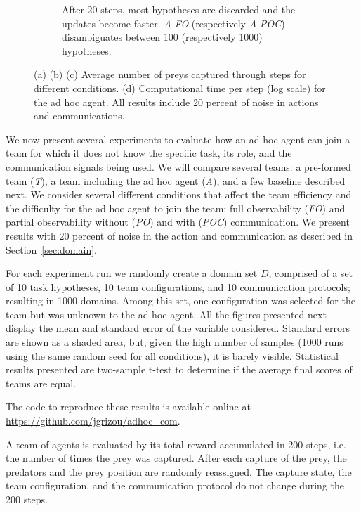 \begin{figure}[t]
\begin{subfigure}[t]{0.245\textwidth}
    \caption{After 20 steps, most hypotheses are discarded and the updates become faster. \emph{A-FO} (respectively \emph{A-POC}) disambiguates between 100 (respectively 1000) hypotheses.}
    \label{fig:comptime}
  \end{subfigure}
  \caption{(a) (b) (c) Average number of preys captured through steps for different conditions. (d) Computational time per step (log scale) for the ad hoc agent. All results include 20 percent of noise in actions and communications.\vspace{-0.3cm}}
  \label{fig:results}
\end{figure}

We now present several experiments to evaluate how an ad hoc agent can join a team for which it does not know the specific task, its role, and the communication signals being used. We will compare several teams: a pre-formed team (\emph{T}), a team including the ad hoc agent (\emph{A}), and a few baseline described next. We consider several different conditions that affect the team efficiency and the difficulty for the ad hoc agent to join the team: full observability (\emph{FO}) and partial observability without (\emph{PO}) and with (\emph{POC}) communication. We present results with 20 percent of noise in the action and communication as described in Section~\ref{sec:domain}.

For each experiment run we randomly create a domain set $D$, comprised of a set of 10 task hypotheses, 10 team configurations, and 10 communication protocols; resulting in 1000 domains. Among this set, one configuration was selected for the team but was unknown to the ad hoc agent. All the figures presented next display the mean and standard error of the variable considered. Standard errors are shown as a shaded area, but, given the high number of samples (1000 runs using the same random seed for all conditions), it is barely visible. Statistical results presented are two-sample t-test to determine if the average final scores of teams are equal.

The code to reproduce these results is available online at \url{https://github.com/jgrizou/adhoc_com}.

A team of agents is evaluated by its total reward accumulated in 200 steps, i.e. the number of times the prey was captured. After each capture of the prey, the predators and the prey position are randomly reassigned. The capture state, the team configuration, and the communication protocol do not change during the 200 steps.

